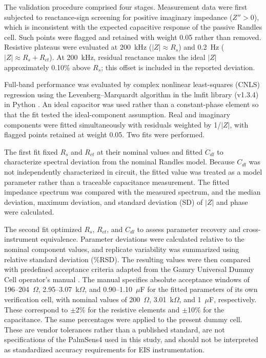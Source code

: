 The validation procedure comprised four stages. Measurement data were first subjected to reactance-sign screening for positive imaginary impedance ($Z'' > 0$), which is inconsistent with the expected capacitive response of the passive Randles cell. Such points were flagged and retained with weight 0.05 rather than removed. Resistive plateaus were evaluated at 200~kHz ($|Z|\approx R_s$) and 0.2~Hz ($|Z|\approx R_s+R_{ct}$). At 200~kHz, residual reactance makes the ideal $|Z|$ approximately 0.10\% above $R_s$; this offset is included in the reported deviation.

Full-band performance was evaluated by complex nonlinear least-squares (CNLS) regression using the Levenberg--Marquardt algorithm in the lmfit library (v1.3.4) in Python \cite{newville2016lmfit}. An ideal capacitor was used rather than a constant-phase element so that the fit tested the ideal-component assumption. Real and imaginary components were fitted simultaneously with residuals weighted by 1/$|Z|$, with flagged points retained at weight 0.05. Two fits were performed.

The first fit fixed $R_s$ and $R_{ct}$ at their nominal values and fitted $C_{dl}$ to characterize spectral deviation from the nominal Randles model. Because $C_{dl}$ was not independently characterized in circuit, the fitted value was treated as a model parameter rather than a traceable capacitance measurement. The fitted impedance spectrum was compared with the measured spectrum, and the median deviation, maximum deviation, and standard deviation (SD) of $|Z|$ and phase were calculated.

The second fit optimized $R_s$, $R_{ct}$, and $C_{dl}$ to assess parameter recovery and cross-instrument equivalence. Parameter deviations were calculated relative to the nominal component values, and replicate variability was summarized using relative standard deviation (\%RSD). The resulting values were then compared with predefined acceptance criteria adapted from the Gamry Universal Dummy Cell operator's manual \cite{gamry2011universal}. The manual specifies absolute acceptance windows of 196--204~$\Omega$, 2.95--3.07~k$\Omega$, and 0.90--1.10~$\mu$F for the fitted parameters of its own verification cell, with nominal values of 200~$\Omega$, 3.01~k$\Omega$, and 1~$\mu$F, respectively. These correspond to $\pm$2\% for the resistive elements and $\pm$10\% for the capacitance. The same percentages were applied to the present dummy cell. These are vendor tolerances rather than a published standard, are not specifications of the PalmSens4 used in this study, and should not be interpreted as standardized accuracy requirements for EIS instrumentation.

